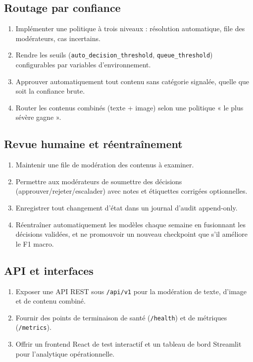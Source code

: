 \subsection{Routage par confiance}
\begin{enumerate}[nosep, label=FR-R\arabic*]
  \item Implémenter une politique à trois niveaux : résolution automatique, file des modérateurs, cas incertains.
  \item Rendre les seuils (\texttt{auto\_decision\_threshold}, \texttt{queue\_threshold}) configurables par variables d'environnement.
  \item Approuver automatiquement tout contenu sans catégorie signalée, quelle que soit la confiance brute.
  \item Router les contenus combinés (texte + image) selon une politique « le plus sévère gagne ».
\end{enumerate}

\subsection{Revue humaine et réentraînement}
\begin{enumerate}[nosep, label=FR-H\arabic*]
  \item Maintenir une file de modération des contenus à examiner.
  \item Permettre aux modérateurs de soumettre des décisions (approuver/rejeter/escalader) avec notes et étiquettes corrigées optionnelles.
  \item Enregistrer tout changement d'état dans un journal d'audit append-only.
  \item Réentraîner automatiquement les modèles chaque semaine en fusionnant les décisions validées, et ne promouvoir un nouveau checkpoint que s'il améliore le F1 macro.
\end{enumerate}

\subsection{API et interfaces}
\begin{enumerate}[nosep, label=FR-A\arabic*]
  \item Exposer une API REST sous \texttt{/api/v1} pour la modération de texte, d'image et de contenu combiné.
  \item Fournir des points de terminaison de santé (\texttt{/health}) et de métriques (\texttt{/metrics}).
  \item Offrir un frontend React de test interactif et un tableau de bord Streamlit pour l'analytique opérationnelle.
\end{enumerate}

